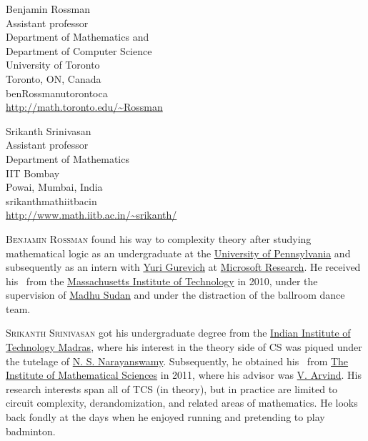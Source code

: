 \documentclass{toc}
\begin{document}
%
%
%
%
%
\begin{tocauthors}
\begin{tocinfo}[rossman]
 Benjamin Rossman\\
 Assistant professor\\
 Department of Mathematics and\\
 Department of Computer Science\\
 University of Toronto\\
 Toronto, ON, Canada\\
 ben\tocdot{}Rossman\tocat{}utoronto\tocdot{}ca \\   %
 \url{http://math.toronto.edu/~Rossman}      %
\end{tocinfo}
\begin{tocinfo}[srinivasan]
  Srikanth Srinivasan\\
  Assistant professor\\
  Department of Mathematics\\
  IIT Bombay\\
  Powai, Mumbai, India\\
  srikanth\tocat{}math\tocdot{}iitb\tocdot{}ac\tocdot{}in\\
  \url{http://www.math.iitb.ac.in/~srikanth/}

\end{tocinfo}
\end{tocauthors}

%
%
%
%
%
%
%
%
%
%
%
%
%
%
\begin{tocaboutauthors}
\begin{tocabout}[rossman]  %
\textsc{Benjamin Rossman} found his way to complexity theory after studying mathematical logic as an undergraduate at the \href{http://www.mit.edu}{University of Pennsylvania} and subsequently as an intern with \href{http://web.eecs.umich.edu/~gurevich/}{Yuri Gurevich} at \href{https://www.microsoft.com/en-us/research/}{Microsoft Research}. He received his \phd\ from the \href{http://www.mit.edu}{Massachusetts Institute of Technology} in 2010, under the supervision of \href{http://madhu.seas.harvard.edu}{Madhu Sudan} and under the distraction of the ballroom dance team. 
\end{tocabout}
\begin{tocabout}[srinivasan]  %
\textsc{Srikanth Srinivasan} 
got his undergraduate degree from the
\href{http://www.iitm.ac.in}{Indian Institute of Technology Madras},
where his interest in the theory side of CS was piqued under the
tutelage of
\href{http://www.cse.iitm.ac.in/~swamy/doku.php?id=welcome_to_my_wiki}{N.
S. Narayanswamy}. %
Subsequently, he obtained his \phd\ from
\href{http://www.imsc.res.in}{The Institute of Mathematical Sciences}
in 2011, where his advisor was \href{http://www.imsc.res.in/~arvind}{V.
Arvind}. %
His research interests span all of TCS (in theory), but in
practice are limited to circuit complexity, derandomization, and
related areas of mathematics.
%
%
He looks back fondly   %
at the days when he enjoyed running and pretending to play
badminton.
\end{tocabout}
\end{tocaboutauthors}
\end{document}
